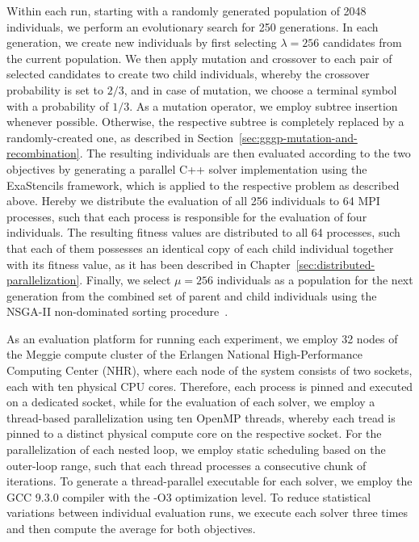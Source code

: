Within each run, starting with a randomly generated population of 2048 individuals, we perform an evolutionary search for 250 generations.
In each generation, we create new individuals by first selecting $\lambda = 256$ candidates from the current population.
We then apply mutation and crossover to each pair of selected candidates to create two child individuals, whereby the crossover probability is set to $2/3$, and in case of mutation, we choose a terminal symbol with a probability of $1/3$.
As a mutation operator, we employ subtree insertion whenever possible. Otherwise, the respective subtree is completely replaced by a randomly-created one, as described in Section~\ref{sec:gggp-mutation-and-recombination}.
The resulting individuals are then evaluated according to the two objectives by generating a parallel C++ solver implementation using the ExaStencils framework, which is applied to the respective problem as described above.
Hereby we distribute the evaluation of all 256 individuals to 64 MPI processes, such that each process is responsible for the evaluation of four individuals.
The resulting fitness values are distributed to all 64 processes, such that each of them possesses an identical copy of each child individual together with its fitness value, as it has been described in Chapter~\ref{sec:distributed-parallelization}.
Finally, we select $\mu = 256$ individuals as a population for the next generation from the combined set of parent and child individuals using the NSGA-II non-dominated sorting procedure~\cite{deb2002fast}.

As an evaluation platform for running each experiment, we employ 32 nodes of the Meggie compute cluster of the Erlangen National High-Performance Computing Center (NHR), where each node of the system consists of two sockets, each with ten physical CPU cores.
Therefore, each process is pinned and executed on a dedicated socket, while for the evaluation of each solver, we employ a thread-based parallelization using ten OpenMP threads, whereby each tread is pinned to a distinct physical compute core on the respective socket.
For the parallelization of each nested loop, we employ static scheduling based on the outer-loop range, such that each thread processes a consecutive chunk of iterations.
To generate a thread-parallel executable for each solver, we employ the GCC 9.3.0 compiler with the -O3 optimization level.
To reduce statistical variations between individual evaluation runs, we execute each solver three times and then compute the average for both objectives.

